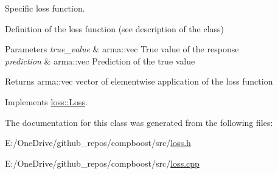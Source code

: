Specific loss function. 

Definition of the loss function (see description of the class)


\begin{DoxyParams}{Parameters}
{\em true\+\_\+value} & {\ttfamily arma\+::vec} True value of the response \\
\hline
{\em prediction} & {\ttfamily arma\+::vec} Prediction of the true value\\
\hline
\end{DoxyParams}
\begin{DoxyReturn}{Returns}
{\ttfamily arma\+::vec} vector of elementwise application of the loss function 
\end{DoxyReturn}


Implements \mbox{\hyperlink{classloss_1_1_loss_ae9f94dd9b8311397583ba3a9cb485e94}{loss\+::\+Loss}}.



The documentation for this class was generated from the following files\+:\begin{DoxyCompactItemize}
\item 
E\+:/\+One\+Drive/github\+\_\+repos/compboost/src/\mbox{\hyperlink{loss_8h}{loss.\+h}}\item 
E\+:/\+One\+Drive/github\+\_\+repos/compboost/src/\mbox{\hyperlink{loss_8cpp}{loss.\+cpp}}\end{DoxyCompactItemize}
